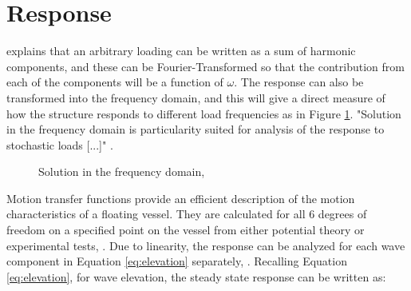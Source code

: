 \section{Response}
\cite{Langen1999} explains that an arbitrary loading can be written as a sum of harmonic components, and these can be Fourier-Transformed so that the contribution from each of the components will be a function of $\omega$. The response can also be transformed into the frequency domain, and this will give a direct measure of how the structure responds to different load frequencies as in Figure \ref{fig:transex}. "Solution in the frequency domain is particularity suited for analysis of the response to stochastic loads [...]" \cite{Langen1999}. 
 
\begin{figure}[H]
\hfill
{}\hfill
  \hfill
\caption[$\; \:$Solution in the frequency domain]{Solution in the frequency domain, \cite{Langen1999}}
\label{fig:transex}
\end{figure}

\noindent Motion transfer functions provide an efficient description of the motion characteristics of a floating vessel. They are calculated for all 6 degrees of freedom on a specified point on the vessel from either potential theory or experimental tests, \cite{sintef2017}. Due to linearity, the response can be analyzed for each wave component in Equation \ref{eq:elevation} separately, \cite{Faltinsen1990}. Recalling Equation \ref{eq:elevation}, for wave elevation, the steady state response can be written as:

